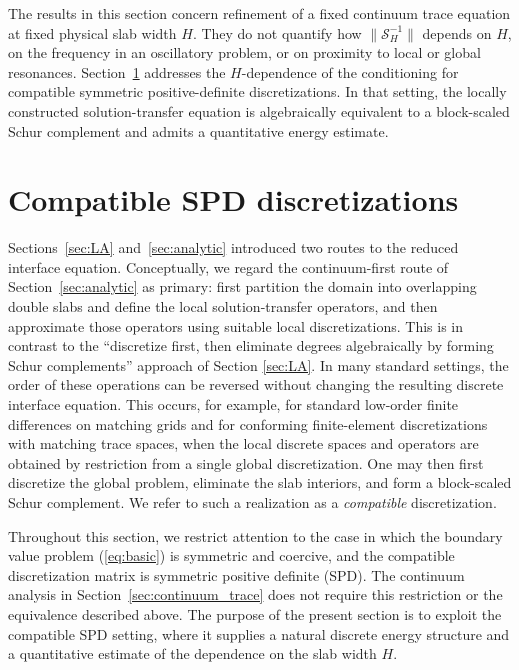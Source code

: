 \documentclass[final,onefignum,onetabnum]{siamart250211}
\theoremstyle{definition}
\begin{document}
The results in this section concern refinement of a fixed continuum trace equation at fixed physical slab width $H$.  They do not quantify how $\|\mathcal S_H^{-1}\|$ depends on $H$, on the frequency in an oscillatory problem, or on proximity to local or global resonances.  
Section~\ref{sec:conditioning} addresses the $H$-dependence of the conditioning for compatible symmetric positive-definite discretizations.
In that setting, the locally constructed solution-transfer equation is algebraically equivalent to a block-scaled Schur complement and admits a quantitative energy estimate.

\section{Compatible SPD discretizations}
\label{sec:conditioning}
Sections~\ref{sec:LA} and~\ref{sec:analytic} introduced two routes to the reduced interface equation.  Conceptually, we regard the continuum-first route of Section~\ref{sec:analytic} as primary: first partition the domain into overlapping double slabs and define the local solution-transfer operators, and then approximate those operators using suitable local discretizations. This is in contrast to the ``discretize first, then eliminate degrees algebraically by forming Schur complements'' approach of Section \ref{sec:LA}. In many standard settings, the order of these operations can be reversed without changing the resulting discrete interface equation.  This occurs, for example, for standard low-order finite differences on matching grids and for conforming finite-element discretizations with matching trace spaces, when the local discrete spaces and operators are obtained by restriction from a single global discretization.  One may then first discretize the global problem, eliminate the slab interiors, and form a block-scaled Schur complement.  We refer to such a realization as a \textit{compatible} discretization.

Throughout this section, we restrict attention to the case in which the boundary value problem (\ref{eq:basic}) is symmetric and coercive, and the compatible discretization matrix is symmetric positive definite (SPD).  The continuum analysis in Section~\ref{sec:continuum_trace} does not require this restriction or the equivalence described above.  The purpose of the present section is to exploit the compatible SPD setting, where it supplies a natural discrete energy structure and a quantitative estimate of the dependence on the slab width $H$.
\end{document}
